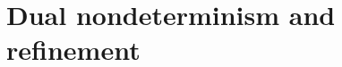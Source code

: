 \documentclass[aspectratio=54]{beamer}
\newcommand{\kw}[1]{\ensuremath{ \mathrm{#1} }}
\begin{document}
%
%
%


\section*{Dual nondeterminism and refinement} %
\end{document}
